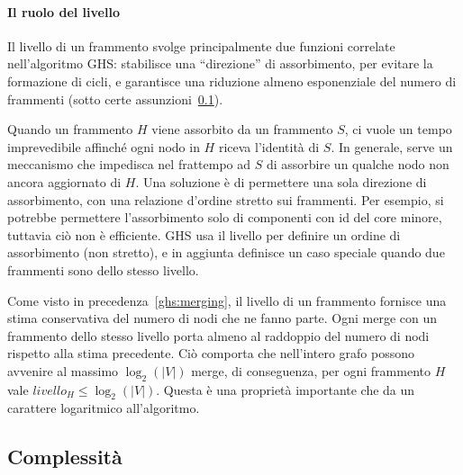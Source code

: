 \documentclass[target=bach,aauheader=,style=]{thud}
\newcommand{\eng}[1]{\foreignlanguage{english}{#1}}
\begin{document}
\paragraph{Il ruolo del livello}\label{ghs:level}
Il livello di un frammento svolge principalmente due funzioni correlate nell'algoritmo GHS: stabilisce una ``direzione'' di assorbimento, per evitare la formazione di cicli, e garantisce una riduzione almeno esponenziale del numero di frammenti (sotto certe assunzioni~\ref{ghs:complexity}).

Quando un frammento $H$ viene assorbito da un frammento $S$, ci vuole un tempo imprevedibile affinché ogni nodo in $H$ riceva l'identità di $S$. In generale, serve un meccanismo che impedisca nel frattempo ad $S$ di assorbire un qualche nodo non ancora aggiornato di $H$. Una soluzione è di permettere una sola direzione di assorbimento, con una relazione d'ordine stretto sui frammenti. Per esempio, si potrebbe permettere l'assorbimento solo di componenti con id del core minore, tuttavia ciò non è efficiente. GHS usa il livello per definire un ordine di assorbimento (non stretto), e in aggiunta definisce un caso speciale quando due frammenti sono dello stesso livello.

Come visto in precedenza~\ref{ghs:merging}, il livello di un frammento fornisce una stima conservativa del numero di nodi che ne fanno parte. Ogni \eng{merge} con un frammento dello stesso livello porta almeno al raddoppio del numero di nodi rispetto alla stima precedente. Ciò comporta che nell'intero grafo possono avvenire al massimo $\log_2(|V|)$ \eng{merge}, di conseguenza, per ogni frammento $H$ vale $livello_H\leq\log_2(|V|)$. Questa è una proprietà importante che da un carattere logaritmico all'algoritmo.

\subsection{Complessità}\label{ghs:complexity}
\end{document}
